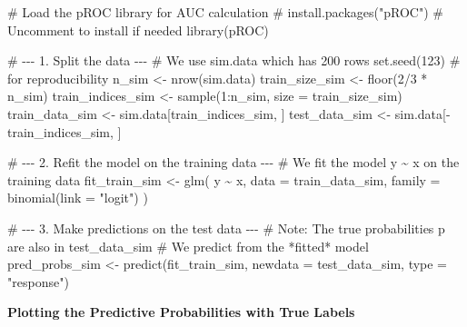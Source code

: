 \documentclass[
  letterpaper,
  DIV=11,
  numbers=noendperiod]{scrreprt}
\newenvironment{Shaded}{\begin{snugshade}}{\end{snugshade}}
\newcommand{\AttributeTok}[1]{\textcolor[rgb]{0.40,0.45,0.13}{#1}}
\newcommand{\CommentTok}[1]{\textcolor[rgb]{0.37,0.37,0.37}{#1}}
\newcommand{\DecValTok}[1]{\textcolor[rgb]{0.68,0.00,0.00}{#1}}
\newcommand{\FunctionTok}[1]{\textcolor[rgb]{0.28,0.35,0.67}{#1}}
\newcommand{\NormalTok}[1]{\textcolor[rgb]{0.00,0.23,0.31}{#1}}
\newcommand{\OtherTok}[1]{\textcolor[rgb]{0.00,0.23,0.31}{#1}}
\newcommand{\SpecialCharTok}[1]{\textcolor[rgb]{0.37,0.37,0.37}{#1}}
\newcommand{\StringTok}[1]{\textcolor[rgb]{0.13,0.47,0.30}{#1}}
\begin{document}
\begin{Shaded}
\begin{Highlighting}[]
\CommentTok{\# Load the pROC library for AUC calculation}
\CommentTok{\# install.packages("pROC") \# Uncomment to install if needed}
\FunctionTok{library}\NormalTok{(pROC)}

\CommentTok{\# {-}{-}{-} 1. Split the data {-}{-}{-}}
\CommentTok{\# We use \textquotesingle{}sim.data\textquotesingle{} which has 200 rows}
\FunctionTok{set.seed}\NormalTok{(}\DecValTok{123}\NormalTok{) }\CommentTok{\# for reproducibility}
\NormalTok{n\_sim }\OtherTok{\textless{}{-}} \FunctionTok{nrow}\NormalTok{(sim.data)}
\NormalTok{train\_size\_sim }\OtherTok{\textless{}{-}} \FunctionTok{floor}\NormalTok{(}\DecValTok{2}\SpecialCharTok{/}\DecValTok{3} \SpecialCharTok{*}\NormalTok{ n\_sim)}
\NormalTok{train\_indices\_sim }\OtherTok{\textless{}{-}} \FunctionTok{sample}\NormalTok{(}\DecValTok{1}\SpecialCharTok{:}\NormalTok{n\_sim, }\AttributeTok{size =}\NormalTok{ train\_size\_sim)}
\NormalTok{train\_data\_sim }\OtherTok{\textless{}{-}}\NormalTok{ sim.data[train\_indices\_sim, ]}
\NormalTok{test\_data\_sim  }\OtherTok{\textless{}{-}}\NormalTok{ sim.data[}\SpecialCharTok{{-}}\NormalTok{train\_indices\_sim, ]}

\CommentTok{\# {-}{-}{-} 2. Refit the model on the training data {-}{-}{-}}
\CommentTok{\# We fit the model y \textasciitilde{} x on the training data}
\NormalTok{fit\_train\_sim }\OtherTok{\textless{}{-}} \FunctionTok{glm}\NormalTok{(}
\NormalTok{  y }\SpecialCharTok{\textasciitilde{}}\NormalTok{ x,}
  \AttributeTok{data =}\NormalTok{ train\_data\_sim,}
  \AttributeTok{family =} \FunctionTok{binomial}\NormalTok{(}\AttributeTok{link =} \StringTok{"logit"}\NormalTok{)}
\NormalTok{)}

\CommentTok{\# {-}{-}{-} 3. Make predictions on the test data {-}{-}{-}}
\CommentTok{\# Note: The true probabilities \textquotesingle{}p\textquotesingle{} are also in test\_data\_sim}
\CommentTok{\# We predict from the *fitted* model}
\NormalTok{pred\_probs\_sim }\OtherTok{\textless{}{-}} \FunctionTok{predict}\NormalTok{(fit\_train\_sim, }\AttributeTok{newdata =}\NormalTok{ test\_data\_sim, }\AttributeTok{type =} \StringTok{"response"}\NormalTok{)}
\end{Highlighting}
\end{Shaded}

\textbf{Plotting the Predictive Probabilities with True Labels}
\end{document}
